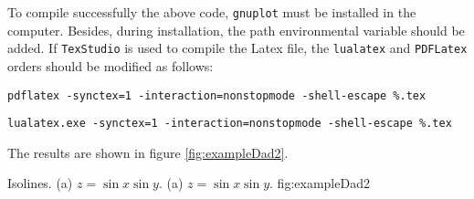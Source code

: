 \vspace{0.5cm} 

To compile successfully the above code,  \verb|gnuplot| must be installed in the computer. Besides,  during installation, the path environmental variable
should be added. If \verb|TexStudio| is used to compile the Latex file, the \verb|lualatex| and \verb|PDFLatex| orders should be modified as follows: 

\verb|pdflatex -synctex=1 -interaction=nonstopmode -shell-escape %.tex|

\verb|lualatex.exe -synctex=1 -interaction=nonstopmode -shell-escape %.tex|




The results are shown in figure  \ref{fig:exampleDad2}. 
\vspace{1cm} 

\twographs
      { }
      { }
      {Isolines. 
      (a) $ z = \sin x \sin y$. 
      (a) $ z = \sin x \sin y$. 
      }
      {fig:exampleDad2}      
